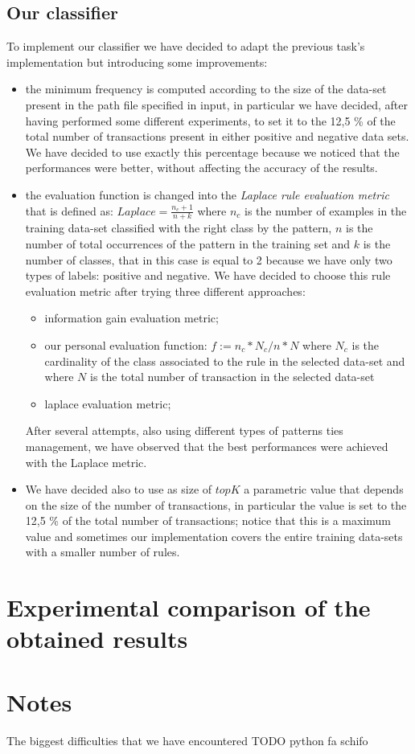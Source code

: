 \documentclass[10pt, a4paper]{article}
\begin{document}
		\subsection{Our classifier}
			To implement our classifier we have decided to adapt the previous task's implementation but introducing some improvements:
			\begin{itemize}
				\item the minimum frequency is computed according to the size of the data-set present in the path file specified in input, in particular we have decided, after having performed some different experiments, to set it to the 12,5 \% of the total number of transactions present in either positive and negative data sets. We have decided to use exactly this percentage because we noticed that the performances were better, without affecting the accuracy of the results.
				\item the evaluation function is changed into the \textit{Laplace rule evaluation metric} that is defined as: $Laplace = \frac{n_c +1}{n + k}$ where $n_c$ is the number of examples in the training data-set classified with the right class by the pattern, $n$ is the number of total occurrences of the pattern in the training set and $k$ is the number of classes, that in this case is equal to 2 because we have only two types of labels: positive and negative.
				We have decided to choose this rule evaluation metric after trying three different approaches:
				\begin{itemize}
					\item information gain evaluation metric;
					\item our personal evaluation function: $f := n_c * N_c / n * N$ where $N_c$ is the cardinality of the class associated to the rule  in the selected data-set and where $N$ is the total number of transaction in the selected data-set 
					\item laplace evaluation metric;
				\end{itemize}
				After several attempts, also using different types of patterns ties management, we have observed that the best performances were achieved with the Laplace metric. 
				\item We have decided also to use as size of $topK$ a parametric value that depends on the size of the number of transactions, in particular the value is set to the 12,5 \% of the total number of transactions; notice that this is a maximum value and sometimes our implementation covers the entire training data-sets with a smaller number of rules.	
			\end{itemize}
			


	\section{Experimental comparison of the obtained results}
	
	
	\section{Notes}
	The biggest difficulties that we have encountered 
	TODO python fa schifo
		
\end{document}
